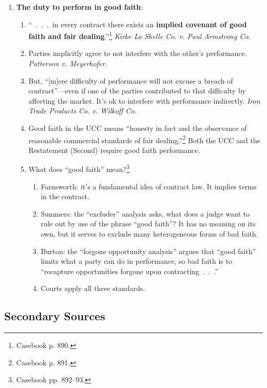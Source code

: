 \begin{enumerate}
\begin{enumerate}
{        Peabody Coal Co.}
    \end{enumerate}
    \item \textbf{The duty to perform in good faith}:
    \begin{enumerate}
        \item ``~.~.~.~in every contract there exists an \textbf{implied 
        covenant of good faith and fair dealing}.''\footnote{Casebook p. 890.} 
        \emph{Kirke La Shelle Co. v. Paul Armstrong Co.}
        \item Parties implicitly agree to not interfere with the other's 
        performance. \emph{Patterson v. Meyerhofer}.
        \item But, ``[m]ere difficulty of performance will not excuse a breach 
        of contract''---even if one of the parties contributed to that 
        difficulty by affecting the market. It's ok to interfere with 
        performance indirectly. \emph{Iron Trade Products Co. v. Wilkoff Co.}
        \item Good faith in the UCC means ``honesty in fact and the observance 
        of reasonable commercial standards of fair 
        dealing.''\footnote{Casebook p. 891.} Both the UCC and the Restatement 
        (Second) require good faith performance.
        \item What does ``good faith'' mean?\footnote{Casebook pp. 892--93.}
        \begin{enumerate}
            \item Farnsworth: it's a fundamental idea of contract law. It implies 
            terms in the contract.
            \item Summers: the ``excluder'' analysis asks, what does a judge want 
            to rule out by use of the phrase ``good faith''? It has no meaning on 
            its own, but it serves to exclude many heterogeneous forms of bad 
            faith.
            \item Burton: the ``forgone opportunity analysis'' argues that ``good 
            faith'' limits what a party can do in performance, so bad faith is to 
            ``recapture opportunities forgone upon 
            contracting~.~.~.''
            \item Courts apply all three standards.
        \end{enumerate}
    \end{enumerate}
\end{enumerate}

\subsection{Secondary Sources}

